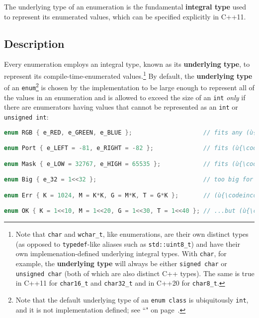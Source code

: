 
The underlying type of an enumeration is the fundamental
\textbf{integral type} used to represent its enumerated values, which
can be specified explicitly in C++11.

\subsection[Description]{Description}\label{description}

Every enumeration employs an integral type, known as its
\textbf{underlying type}, to represent its compile-time-enumerated
values.{\cprotect\footnote{Note that \texttt{char} and
\texttt{wchar\_t}, like enumerations, are their own distinct types (as
opposed to \texttt{typedef}-like aliases such as
\texttt{std::uint8\_t}) and have their own implemenation-defined
underlying integral types. With \texttt{char}, for example, the
\textbf{underlying type} will always be either
\texttt{signed}~\texttt{char} or \texttt{unsigned}~\texttt{char} (both
of which are also distinct C++ types). The same is true in C++11 for
\texttt{char16\_t} and \texttt{char32\_t} and in C++20 for
  \texttt{char8\_t}.}} By default, the \textbf{underlying type} of an
\texttt{enum}{\cprotect\footnote{Note that the default underlying type
of an \texttt{enum}~\texttt{class} is ubiquitously \texttt{int}, and
it is not implementation defined; see ``" on page~\pageref{enumclass}.}} is chosen by the
implementation to be large enough to represent all of the values in an
enumeration and is allowed to exceed the size of an \texttt{int}
\emph{only} if there are enumerators having values that cannot be
represented as an \texttt{int} or \texttt{unsigned}~\texttt{int}:

\begin{lstlisting}[language=C++]
enum RGB { e_RED, e_GREEN, e_BLUE };                    // fits any (ù{\codeincomments{char}}ù)

enum Port { e_LEFT = -81, e_RIGHT = -82 };              // fits (ù{\codeincomments{signed char}}ù)

enum Mask { e_LOW = 32767, e_HIGH = 65535 };            // fits (ù{\codeincomments{unsigned short}}ù)

enum Big { e_32 = 1<<32 };                              // too big for (ù{\codeincomments{int}}ù)

enum Err { K = 1024, M = K*K, G = M*K, T = G*K };       // (ù{\codeincomments{G*K}}ù) overflows (ù{\codeincomments{int}}ù)...

enum OK { K = 1<<10, M = 1<<20, G = 1<<30, T = 1<<40 }; // ...but (ù{\codeincomments{1<<40}}ù) is OK
\end{lstlisting}
    
